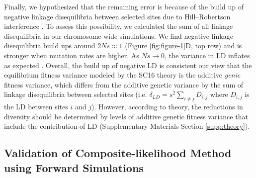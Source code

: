\documentclass[11pt]{article}
\begin{document}
Finally, we hypothesized that the remaining error is because of the build up of
negative linkage disequilibria between selected sites due to Hill--Robertson
interference \parencite{Hill1966-kd,McVean2000-bt,Comeron2007-wq}. To assess
this possibility, we calculated the sum of all linkage disequilibria in our
chromosome-wide simulations. We find negative linkage disequilibria build ups
around $2Ns \approx 1$ (Figure \ref{fig:figure-1}D, top row) and is stronger
when mutation rates are higher. As $Ns \to 0$, the variance in LD inflates as
expected \parencite{Ohta1969-ae,Hill1968-ue}. Overall, the build up of negative
LD is consistent our view that the equilibrium fitness variance modeled by the
SC16 theory is the additive \emph{genic} fitness variance, which differs from
the additive genetic variance by the sum of linkage disequilibria between
selected sites (i.e. $\delta_{LD} = s^2 \sum_{i\ne j} D_{i,j}$ where $D_{i,j}$
is the LD between sites $i$ and $j$). However, according to theory, the
reductions in diversity should be determined by levels of additive genetic
fitness variance that include the contribution of LD (Supplementary Materials
Section \ref{supp:theory}).

\subsection*{Validation of Composite-likelihood Method using Forward
Simulations}
\end{document}
